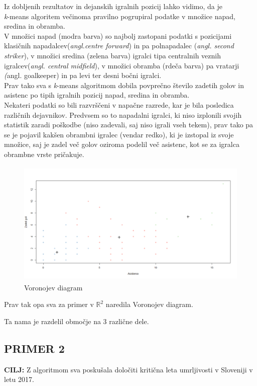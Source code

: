 \documentclass[11pt, a4paper]{article}
\begin{document}
\noindent Iz dobljenih rezultatov in dejanskih igralnih pozicij lahko vidimo, da je \\
 \textsl{k}-means algoritem večinoma pravilno pogrupiral podatke v množice napad, sredina in obramba.\\
 V množici napad (modra barva) so najbolj zastopani podatki s pozicijami klasičnih napadalcev(\textsl{angl.centre forward}) in pa polnapadalec (\textsl{angl. second striker}), v množici sredina (zelena barva) igralci tipa centralnih veznih igralcev(\textsl{angl. central midfield}), v množici obramba (rdeča barva) pa vratarji \textsl({angl. goalkeeper}) in pa levi ter desni bočni igralci. \\
\noindent Prav tako sva s \textsl{k}-means algoritmom dobila povprečno število zadetih golov in asistenc po tipih igralnih pozicij napad, sredina in obramba. \\
\noindent Nekateri podatki so bili razvrščeni v napačne razrede, kar je bila posledica različnih dejavnikov. Predvsem so to napadalni igralci, ki niso izplonili svojih statistik zaradi poškodbe (niso zadevali, saj niso igrali vseh tekem), prav tako pa se je pojavil kakšen obrambni igralec (vendar redko), ki je izstopal iz svoje množice, saj je zadel več golov oziroma podelil več asistenc, kot se za igralca obrambne vrste pričakuje.

\vspace{0.5 cm}

\begin{figure}[h]
\caption{Voronojev diagram}
\centering
\includegraphics[width=12cm, height=6cm]{Voronojgoli}
\end{figure}

\noindent Prav tak opa sva za primer v $\mathbb{R}^2$ naredila Voronojev diagram.

\noindent Ta nama je razdelil območje na 3 različne dele. 

\subsection{PRIMER 2}
\textbf{CILJ:} Z algoritmom sva poskušala določiti kritična leta umrljivosti v Sloveniji v letu 2017. \\
\end{document}
